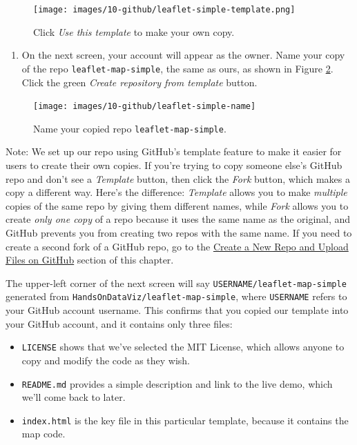 \documentclass[
  english,
]{book}
\providecommand{\tightlist}{%
  \setlength{\itemsep}{0pt}\setlength{\parskip}{0pt}}
\begin{document}
\begin{figure}
\centering
\texttt{[image: images/10-github/leaflet-simple-template.png]}
\caption{\label{fig:leaflet-simple-template}Click \emph{Use this template} to make your own copy.}
\end{figure}

\begin{enumerate}
\def\labelenumi{\arabic{enumi}.}
\setcounter{enumi}{3}
\tightlist
\item
  On the next screen, your account will appear as the owner. Name your copy of the repo \texttt{leaflet-map-simple}, the same as ours, as shown in Figure \ref{fig:leaflet-simple-name}. Click the green \emph{Create repository from template} button.
\end{enumerate}



\begin{figure}
\texttt{[image: images/10-github/leaflet-simple-name]} \caption{Name your copied repo \texttt{leaflet-map-simple}.}\label{fig:leaflet-simple-name}
\end{figure}

Note: We set up our repo using GitHub's template feature to make it easier for users to create their own copies. If you're trying to copy someone else's GitHub repo and don't see a \emph{Template} button, then click the \emph{Fork} button, which makes a copy a different way. Here's the difference: \emph{Template} allows you to make \emph{multiple} copies of the same repo by giving them different names, while \emph{Fork} allows you to create \emph{only one copy} of a repo because it uses the same name as the original, and GitHub prevents you from creating two repos with the same name. If you need to create a second fork of a GitHub repo, go to the \href{create-repo.html}{Create a New Repo and Upload Files on GitHub} section of this chapter.

The upper-left corner of the next screen will say \texttt{USERNAME/leaflet-map-simple} generated from \texttt{HandsOnDataViz/leaflet-map-simple}, where \texttt{USERNAME} refers to your GitHub account username. This confirms that you copied our template into your GitHub account, and it contains only three files:

\begin{itemize}
\tightlist
\item
  \texttt{LICENSE} shows that we've selected the MIT License, which allows anyone to copy and modify the code as they wish.
\item
  \texttt{README.md} provides a simple description and link to the live demo, which we'll come back to later.
\item
  \texttt{index.html} is the key file in this particular template, because it contains the map code.
\end{itemize}
\end{document}
